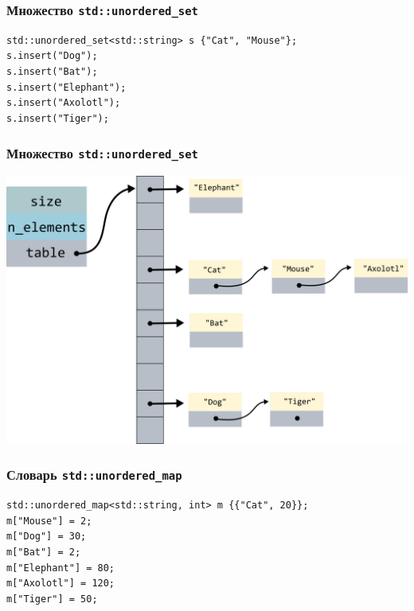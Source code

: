 \documentclass[10pt,pdf,hyperref={unicode}]{beamer}
\begin{document}
\begin{frame}[fragile]
\frametitle{Множество \texttt{std::unordered\_set}}
\begin{lstlisting}
std::unordered_set<std::string> s {"Cat", "Mouse"};
s.insert("Dog");
s.insert("Bat");
s.insert("Elephant");
s.insert("Axolotl");
s.insert("Tiger");
\end{lstlisting}
\end{frame}

\begin{frame}[fragile]
\frametitle{Множество \texttt{std::unordered\_set}}
\begin{center}
\includegraphics[scale=0.7]{images/hashtable/hashtable_set.png}
\end{center}
\end{frame}


\begin{frame}[fragile]
\frametitle{Словарь \texttt{std::unordered\_map}}
\begin{lstlisting}
std::unordered_map<std::string, int> m {{"Cat", 20}};
m["Mouse"] = 2;
m["Dog"] = 30;
m["Bat"] = 2;
m["Elephant"] = 80;
m["Axolotl"] = 120;
m["Tiger"] = 50;
\end{lstlisting}
\end{frame}
\end{document}
